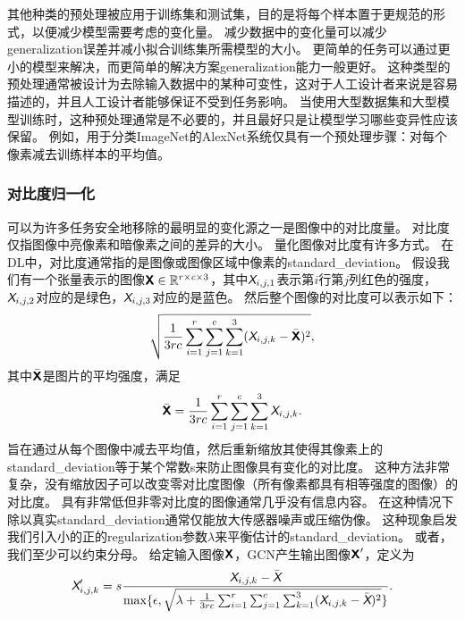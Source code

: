其他种类的预处理被应用于训练集和测试集，目的是将每个样本置于更规范的形式，以便减少模型需要考虑的变化量。
减少数据中的变化量可以减少\gls{generalization}误差并减小拟合训练集所需模型的大小。
更简单的任务可以通过更小的模型来解决，而更简单的解决方案\gls{generalization}能力一般更好。
这种类型的预处理通常被设计为去除输入数据中的某种可变性，这对于人工设计者来说是容易描述的，并且人工设计者能够保证不受到任务影响。
当使用大型数据集和大型模型训练时，这种预处理通常是不必要的，并且最好只是让模型学习哪些变异性应该保留。%
例如，用于分类ImageNet的AlexNet系统仅具有一个预处理步骤：对每个像素减去训练样本的平均值\citep{Krizhevsky-2012}。

\subsubsection{对比度归一化}
\label{sec:contrast_normalization}

可以为许多任务安全地移除的最明显的变化源之一是图像中的对比度量。
对比度仅指图像中亮像素和暗像素之间的差异的大小。
量化图像对比度有许多方式。
在\gls{DL}中，对比度通常指的是图像或图像区域中像素的\gls{standard_deviation}。
假设我们有一个张量表示的图像$\textsf{\textbf{X}} \in\mathbb{R}^{r\times c\times 3}$，其中$\textit{\textsf{X}}_{i,j,1}$表示第$i$行第$j$列红色的强度，$\textit{\textsf{X}}_{i,j,2}$对应的是绿色，$\textit{\textsf{X}}_{i,j,3}$对应的是蓝色。
然后整个图像的对比度可以表示如下：
\begin{align}
\label{eqn:121}
\sqrt{\frac{1}{3rc}\sum_{i=1}^{r} \sum_{j=1}^{c}\sum_{k=1}^{3} (\textit{\textsf{X}}_{i,j,k} - \bar{\textsf{\textbf{X}}} )^2},
\end{align}
其中$\bar{\textsf{\textbf{X}}}$是图片的平均强度，满足
\begin{align}
\label{eqn:122}
 \bar{\textsf{\textbf{X}}} =  \frac{1}{3rc}\sum_{i=1}^{r} \sum_{j=1}^{c}\sum_{k=1}^{3}\textit{\textsf{X}}_{i,j,k}.
\end{align}
旨在通过从每个图像中减去平均值，然后重新缩放其使得其像素上的\gls{standard_deviation}等于某个常数s来防止图像具有变化的对比度。
这种方法非常复杂，没有缩放因子可以改变零对比度图像（所有像素都具有相等强度的图像）的对比度。
具有非常低但非零对比度的图像通常几乎没有信息内容。
在这种情况下除以真实\gls{standard_deviation}通常仅能放大传感器噪声或压缩伪像。
这种现象启发我们引入小的正的\gls{regularization}参数$\lambda$来平衡估计的\gls{standard_deviation}。
或者，我们至少可以约束分母。
给定输入图像$\textsf{\textbf{X}}$，\gls{GCN}产生输出图像$\textsf{\textbf{X}}'$，定义为
\begin{align}
\label{eqn:123}
\textit{\textsf{X}}'_{i,j,k} = s\frac{\textit{\textsf{X}}_{i,j,k} - \bar{\textit{\textsf{X}}}}{\max\{ \epsilon, \sqrt{ \lambda + {\frac{1}{3rc}\sum_{i=1}^{r}\sum_{j=1}^{c}\sum_{k=1}^{3}} (\textit{\textsf{X}}_{i,j,k} - \bar{\textit{\textsf{X}}} )^2} \}}.
\end{align}


